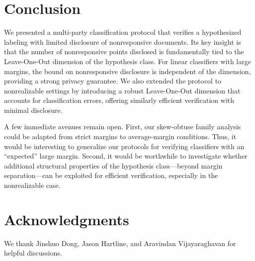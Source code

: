 \section{Conclusion}

We presented a multi-party classification protocol that verifies a hypothesized labeling with limited disclosure of nonresponsive documents. Its key insight is that the number of nonresponsive points disclosed is fundamentally tied to the Leave-One-Out dimension of the hypothesis class. For linear classifiers with large margins, the bound on nonresponsive disclosure is independent of the dimension, providing a strong privacy guarantee. We also extended the protocol to nonrealizable settings by introducing a robust Leave-One-Out dimension that accounts for classification errors, offering similarly efficient verification with minimal disclosure.

A few immediate avenues remain open. First, our skew-obtuse family analysis could be adapted from strict margins to average-margin conditions. Thus, it would be interesting to generalize our protocols for verifying classifiers with an “expected” large margin. 
Second, it would be worthwhile to investigate whether additional structural properties of the hypothesis class—beyond margin separation—can be exploited for efficient verification, especially in the nonrealizable case.


\section*{Acknowledgments}

We thank Jinshuo Dong, Jason Hartline, and Aravindan Vijayaraghavan for helpful discussions. 